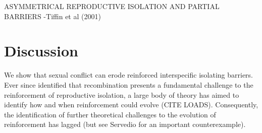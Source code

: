 \documentclass[11pt]{article}
\begin{document}


ASYMMETRICAL REPRODUCTIVE ISOLATION AND PARTIAL BARRIERS
-Tiffin et al (2001)


\section*{Discussion}

We show that sexual conflict can erode reinforced interspecific isolating barriers. 
Ever since \citet{felsenstein1981} identified that recombination presents  a fundamental challenge to the reinforcement of reproductive isolation, a large body of theory has aimed to identify how and when reinforcement could evolve (CITE  LOADS). 
Consequently, the identification of further theoretical challenges to the evolution of reinforcement has lagged (but see \citet{}Servedio for an important counterexample).
\end{document}
